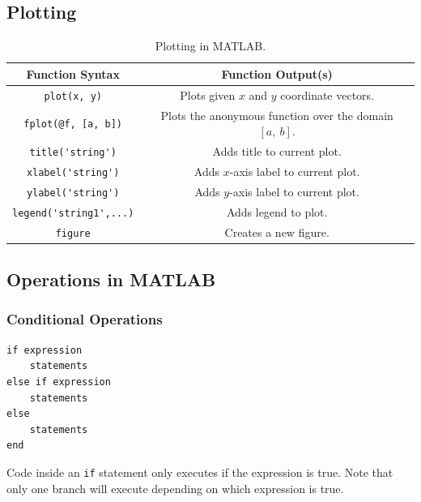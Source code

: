 \documentclass{article}
\begin{document}
\subsection{Plotting}
\begin{table}[H]
    \centering
    \begin{tabular}{c c}
        \toprule
        Function Syntax                   & Function Output(s)                                                      \\
        \midrule
        \lstinline!plot(x, y)!            & Plots given \(x\) and \(y\) coordinate vectors.                         \\
        \lstinline!fplot(@f, [a, b])!     & Plots the anonymous function over the domain \(\left[ a,\: b \right]\). \\
        \lstinline!title('string')!       & Adds title to current plot.                                             \\
        \lstinline!xlabel('string')!      & Adds \(x\)-axis label to current plot.                                  \\
        \lstinline!ylabel('string')!      & Adds \(y\)-axis label to current plot.                                  \\
        \lstinline!legend('string1',...)! & Adds legend to plot.                                                    \\ %
        \lstinline!figure!                & Creates a new figure.                                                   \\
        \bottomrule
    \end{tabular}
    \caption{Plotting in MATLAB.}
\end{table}
\subsection{Operations in MATLAB}
\subsubsection{Conditional Operations}
\begin{multicols}{2}
    \begin{lstlisting}
if expression
    statements
else if expression
    statements
else
    statements
end
    \end{lstlisting}
    \columnbreak
    Code inside an \lstinline{if} statement only executes if the expression is true. Note that only one branch will execute depending on which expression is true.
\end{multicols}
\end{document}
